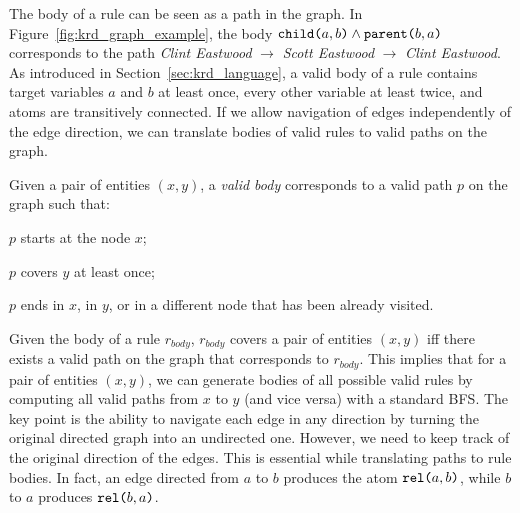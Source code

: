The body of a rule can be seen as a path in the graph. In Figure~\ref{fig:krd_graph_example}, the body $\texttt{child(}a,b\texttt{)} \wedge \texttt{parent(}b,a\texttt{)}$ corresponds to the path \textit{Clint Eastwood} $\rightarrow$ \textit{Scott Eastwood} $\rightarrow$ \textit{Clint Eastwood}. 
As introduced in Section~\ref{sec:krd_language}, a valid body of a rule contains target variables $a$ and $b$ at least once, every other variable at least twice, and atoms are transitively connected. 
If we allow navigation of edges independently of the edge direction, we can translate bodies of valid rules to valid paths on the graph.
\begin{inparaenum}[(i)]
	Given a pair of entities $(x,y)$, a {\em valid body} corresponds to a valid path $p$ on the graph such that:
	\item $p$ starts at the node $x$;
	\item $p$ covers $y$ at least once;
	\item $p$ ends in $x$, in $y$, or in a different node that has been already visited.
\end{inparaenum}
%
Given the body of a rule $r_{body}$, $r_{body}$ covers a pair of entities $(x,y)$ iff there exists a valid path on the graph that corresponds to $r_{body}$. This implies that for a pair of entities $(x,y)$, we can generate bodies of all possible valid rules by computing all valid paths from $x$ to $y$ (and vice versa) with a standard BFS. The key point is the ability to navigate each edge in any direction by turning the original directed graph into an undirected one.
However, we need to keep track of the original direction of the edges. This is essential while translating paths to rule bodies. In fact, %
an edge directed from $a$ to $b$ produces the atom $\texttt{rel(}a,b\texttt{)}$, while $b$ to $a$ produces $\texttt{rel(}b,a\texttt{)}$. 

